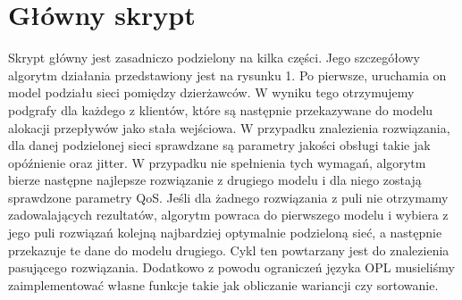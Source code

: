 \section{Główny skrypt}

Skrypt główny jest zasadniczo podzielony na kilka części. Jego szczegółowy algorytm działania przedstawiony
jest na rysunku 1. Po pierwsze, uruchamia on model podziału sieci pomiędzy dzierżawców.
W wyniku tego otrzymujemy podgrafy dla każdego z klientów, które są następnie przekazywane
do modelu alokacji przepływów jako stała wejściowa. W przypadku znalezienia rozwiązania,
dla danej podzielonej sieci sprawdzane są parametry jakości obsługi takie jak opóźnienie
oraz jitter. W przypadku nie spełnienia tych wymagań, algorytm bierze następne najlepsze rozwiązanie z drugiego modelu i dla niego zostają sprawdzone
parametry QoS. Jeśli dla żadnego rozwiązania z puli nie otrzymamy zadowalających rezultatów,
algorytm powraca do pierwszego modelu i wybiera z jego puli rozwiązań kolejną najbardziej
optymalnie podzieloną sieć, a następnie przekazuje te dane do modelu drugiego.
Cykl ten powtarzany jest do znalezienia pasującego rozwiązania.
\newline \newline
Dodatkowo z powodu ograniczeń języka OPL musieliśmy zaimplementować własne funkcje
takie jak obliczanie wariancji czy sortowanie.
